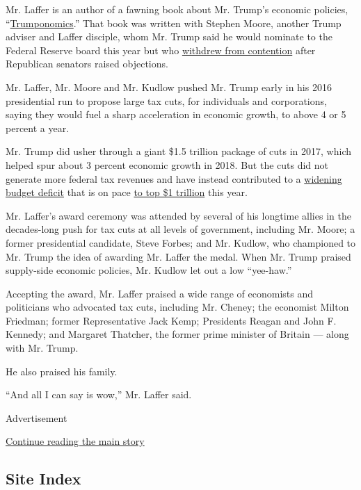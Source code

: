 Mr. Laffer is an author of a fawning book about Mr. Trump's economic
policies,
``\href{https://www.amazon.com/Trumponomics-Inside-America-Revive-Economy/dp/1250193710}{Trumponomics}.''
That book was written with Stephen Moore, another Trump adviser and
Laffer disciple, whom Mr. Trump said he would nominate to the Federal
Reserve board this year but who
\href{https://www.nytimes3xbfgragh.onion/2019/05/02/business/stephen-moore-fed.html}{withdrew
from contention} after Republican senators raised objections.

Mr. Laffer, Mr. Moore and Mr. Kudlow pushed Mr. Trump early in his 2016
presidential run to propose large tax cuts, for individuals and
corporations, saying they would fuel a sharp acceleration in economic
growth, to above 4 or 5 percent a year.

Mr. Trump did usher through a giant \$1.5 trillion package of cuts in
2017, which helped spur about 3 percent economic growth in 2018. But the
cuts did not generate more federal tax revenues and have instead
contributed to a
\href{https://www.nytimes3xbfgragh.onion/2019/01/11/business/trump-tax-cuts-revenue.html}{widening
budget deficit} that is on pace
\href{https://www.nytimes3xbfgragh.onion/2019/01/08/us/politics/budget-deficit-trillion.html}{to
top \$1 trillion} this year.

Mr. Laffer's award ceremony was attended by several of his longtime
allies in the decades-long push for tax cuts at all levels of
government, including Mr. Moore; a former presidential candidate, Steve
Forbes; and Mr. Kudlow, who championed to Mr. Trump the idea of awarding
Mr. Laffer the medal. When Mr. Trump praised supply-side economic
policies, Mr. Kudlow let out a low ``yee-haw.''

Accepting the award, Mr. Laffer praised a wide range of economists and
politicians who advocated tax cuts, including Mr. Cheney; the economist
Milton Friedman; former Representative Jack Kemp; Presidents Reagan and
John F. Kennedy; and Margaret Thatcher, the former prime minister of
Britain --- along with Mr. Trump.

He also praised his family.

``And all I can say is wow,'' Mr. Laffer said.

Advertisement

\protect\hyperlink{after-bottom}{Continue reading the main story}

\hypertarget{site-index}{%
\subsection{Site Index}\label{site-index}}

